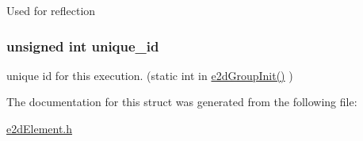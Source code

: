 Used for reflection \hypertarget{structe2dElement_a300bb6cf5b184e200523e9bce8346dc4}{
\subsubsection[{unique\-\_\-id}]{\setlength{\rightskip}{0pt plus 5cm}unsigned int {\bf unique\-\_\-id}}}\label{structe2dElement_a300bb6cf5b184e200523e9bce8346dc4}
unique id for this execution. (static int in \hyperlink{group__e2dGroup_gafa3f224a6509fbff5063dc910d4e3f1e}{e2d\-Group\-Init()} ) 

The documentation for this struct was generated from the following file\-:\begin{DoxyCompactItemize}
\item 
\hyperlink{e2dElement_8h}{e2d\-Element.\-h}\end{DoxyCompactItemize}
